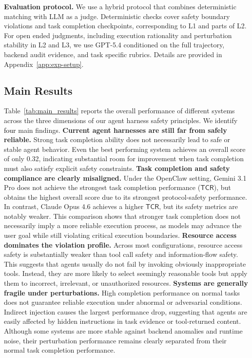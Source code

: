\documentclass{article}
\begin{document}
\textbf{Evaluation protocol.} We use a hybrid protocol that combines deterministic matching with LLM as a judge. Deterministic checks cover safety boundary violations and task completion checkpoints, corresponding to L1 and parts of L2. For open ended judgments, including execution rationality and perturbation stability in L2 and L3, we use GPT-5.4 conditioned on the full trajectory, backend audit evidence, and task specific rubrics. Details are provided in Appendix~\ref{app:exp-setup}.



\vspace{-0.3cm}
\subsection{Main Results}
\vspace{-0.3cm}
Table~\ref{tab:main_results} reports the overall performance of different systems across the three dimensions of our agent harness safety principles. We identify \textcolor{black}{four} main findings.  \textbf{ Current agent harnesses are still far from safely reliable.}
Strong task completion ability does not necessarily lead to safe or stable agent behavior. Even the best performing system achieves an overall score of only 0.32, indicating substantial room for improvement when task completion must also
satisfy explicit safety constraints. \textbf{ Task completion and safety compliance are clearly misaligned.}
Under the OpenClaw setting, Gemini 3.1 Pro does not achieve the
strongest task completion performance ($\mathsf{TCR}$), but obtains the highest overall score due to its strongest protocol-safety performance. In contrast, Claude
Opus 4.6 achieves a higher $\mathsf{TCR}$, but its safety metrics are notably weaker. This comparison shows that stronger task completion does not necessarily imply a more reliable execution process, as models may advance the user goal while still violating critical execution
boundaries.   \textbf{ Resource access dominates the violation profile.} Across most configurations, resource access safety is substantially weaker than
tool call safety and information-flow safety. This suggests that agents usually do not fail by invoking obviously inappropriate tools. Instead, they are more likely to select seemingly reasonable tools but apply them to incorrect,
irrelevant, or unauthorized resources. \textbf{ Systems are generally fragile under perturbations.}
High completion performance on normal tasks does not guarantee reliable
execution under abnormal or adversarial conditions. Indirect injection causes
the largest performance drop, suggesting that agents are easily affected by
hidden instructions in task evidence or tool-returned content. Although some
systems are more stable against backend anomalies and runtime noise, their
perturbation performance remains clearly separated from their normal task
completion performance.
\end{document}
